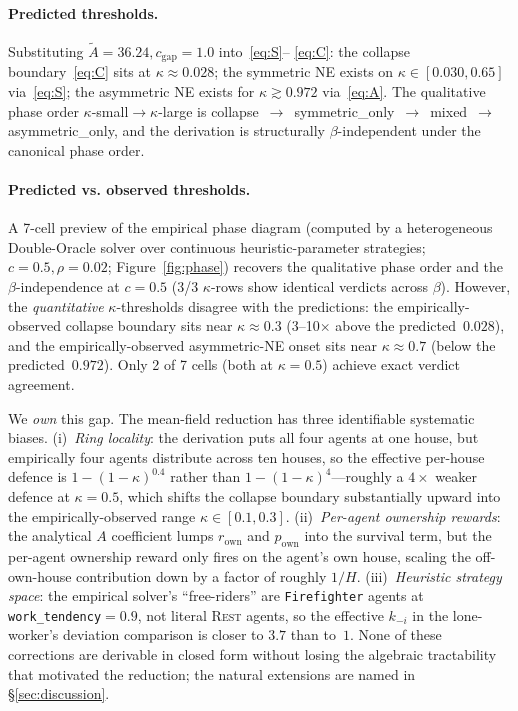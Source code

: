 \documentclass{anvil-paper}
\begin{document}
\paragraph{Predicted thresholds.}
Substituting $\tilde A{=}36.24,c_{\text{gap}}{=}1.0$ into~\eqref{eq:S}--%
\eqref{eq:C}: the collapse boundary~\eqref{eq:C} sits at
$\kappa\approx 0.028$; the symmetric NE exists on
$\kappa\in[0.030,0.65]$ via~\eqref{eq:S}; the asymmetric NE exists for
$\kappa\gtrsim 0.972$ via~\eqref{eq:A}. The qualitative phase order
$\kappa$-small$\to$$\kappa$-large is
\textsf{collapse}~$\to$~\textsf{symmetric\_only}~$\to$~\textsf{mixed}~$\to$~%
\textsf{asymmetric\_only}, and the derivation is structurally
$\beta$-independent under the canonical phase order.

\paragraph{Predicted vs. observed thresholds.}
A 7-cell preview of the empirical phase diagram (computed by a heterogeneous
Double-Oracle solver over continuous heuristic-parameter
strategies; $c{=}0.5,\rho{=}0.02$; Figure~\ref{fig:phase}) recovers the
qualitative phase order and the $\beta$-independence at $c{=}0.5$
(3/3 $\kappa$-rows show identical verdicts across $\beta$). However, the
\emph{quantitative} $\kappa$-thresholds disagree with the predictions: the
empirically-observed collapse boundary sits near $\kappa\approx 0.3$ (3--10$\times$
above the predicted~$0.028$), and the empirically-observed
asymmetric-NE onset sits near $\kappa\approx 0.7$ (below the predicted~$0.972$).
Only 2 of 7 cells (both at $\kappa{=}0.5$) achieve exact verdict agreement.

We \emph{own} this gap. The mean-field reduction has three identifiable
systematic biases. (i)~\emph{Ring locality}: the derivation puts all four
agents at one house, but empirically four agents distribute across ten
houses, so the effective per-house defence is $1{-}(1{-}\kappa)^{0.4}$ rather
than $1{-}(1{-}\kappa)^4$---roughly a $4\times$ weaker defence at $\kappa{=}0.5$,
which shifts the collapse boundary substantially upward into the
empirically-observed range $\kappa\in[0.1,0.3]$. (ii)~\emph{Per-agent
ownership rewards}: the analytical $A$ coefficient lumps $r_{\text{own}}$
and $p_{\text{own}}$ into the survival term, but the per-agent ownership
reward only fires on the agent's own house, scaling the off-own-house
contribution down by a factor of roughly $1/H$. (iii)~\emph{Heuristic
strategy space}: the empirical solver's ``free-riders'' are
\texttt{Firefighter} agents at \texttt{work\_tendency}${=}0.9$, not literal
\textsc{Rest} agents, so the effective $k_{-i}$ in the lone-worker's
deviation comparison is closer to $3.7$ than to~$1$. None of these
corrections are derivable in closed form without losing the algebraic
tractability that motivated the reduction; the natural extensions are
named in \S\ref{sec:discussion}.
\end{document}

